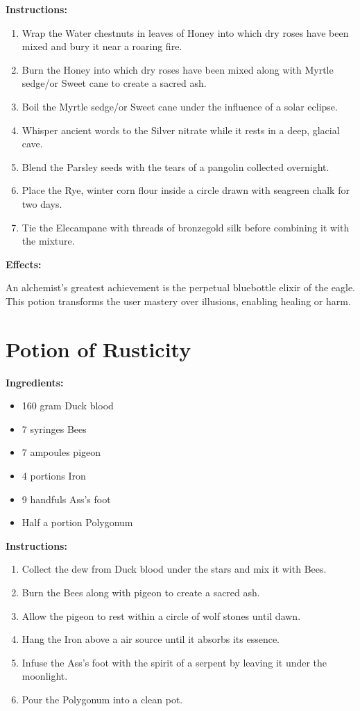 \documentclass{article}
\begin{document}
\textbf{Instructions:}

\begin{enumerate}
  \item Wrap the Water chestnuts in leaves of Honey into which dry roses have been mixed and bury it near a roaring fire.
  \item Burn the Honey into which dry roses have been mixed along with Myrtle sedge/or Sweet cane to create a sacred ash.
  \item Boil the Myrtle sedge/or Sweet cane under the influence of a solar eclipse.
  \item Whisper ancient words to the Silver nitrate while it rests in a deep, glacial cave.
  \item Blend the Parsley seeds with the tears of a pangolin collected overnight.
  \item Place the Rye, winter corn flour inside a circle drawn with seagreen chalk for two days.
  \item Tie the Elecampane with threads of bronzegold silk before combining it with the mixture.
\end{enumerate}

\textbf{Effects:}

An alchemist's greatest achievement is the perpetual bluebottle elixir of the eagle. This potion transforms the user mastery over illusions, enabling healing or harm.

\newpage
\section*{Potion of Rusticity}

\textbf{Ingredients:}

\begin{itemize}
  \item 160 gram Duck blood
  \item 7 syringes Bees
  \item 7 ampoules pigeon
  \item 4 portions Iron
  \item 9 handfuls Ass's foot
  \item Half a portion Polygonum
\end{itemize}

\textbf{Instructions:}

\begin{enumerate}
  \item Collect the dew from Duck blood under the stars and mix it with Bees.
  \item Burn the Bees along with pigeon to create a sacred ash.
  \item Allow the pigeon to rest within a circle of wolf stones until dawn.
  \item Hang the Iron above a air source until it absorbs its essence.
  \item Infuse the Ass's foot with the spirit of a serpent by leaving it under the moonlight.
  \item Pour the Polygonum into a clean pot.
\end{enumerate}
\end{document}
